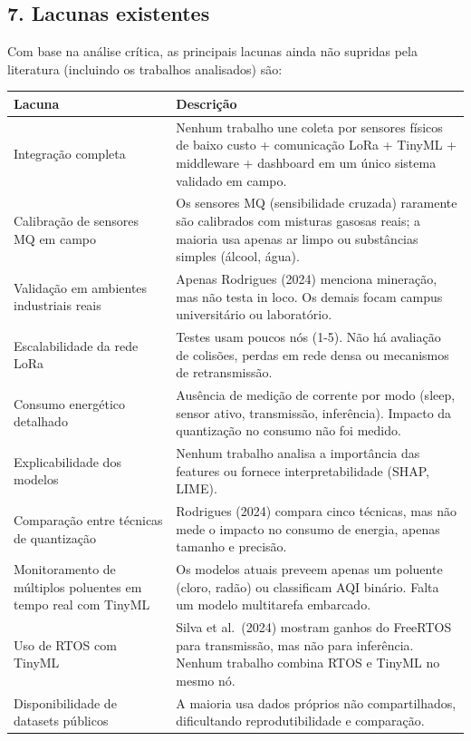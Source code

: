 \documentclass[12pt,a4paper]{article}
\begin{document}
\subsection*{7. Lacunas existentes}

Com base na análise crítica, as principais lacunas ainda não supridas pela literatura (incluindo os trabalhos analisados) são:

\begin{table}[H]
\centering
\small
\begin{tabularx}{\textwidth}{|p{3.5cm}|X|}
\hline
\textbf{Lacuna} & \textbf{Descrição} \\
\hline
Integração completa & Nenhum trabalho une coleta por sensores físicos de baixo custo + comunicação LoRa + TinyML + middleware + dashboard em um único sistema validado em campo. \\
\hline
Calibração de sensores MQ em campo & Os sensores MQ (sensibilidade cruzada) raramente são calibrados com misturas gasosas reais; a maioria usa apenas ar limpo ou substâncias simples (álcool, água). \\
\hline
Validação em ambientes industriais reais & Apenas Rodrigues (2024) menciona mineração, mas não testa in loco. Os demais focam campus universitário ou laboratório. \\
\hline
Escalabilidade da rede LoRa & Testes usam poucos nós (1-5). Não há avaliação de colisões, perdas em rede densa ou mecanismos de retransmissão. \\
\hline
Consumo energético detalhado & Ausência de medição de corrente por modo (sleep, sensor ativo, transmissão, inferência). Impacto da quantização no consumo não foi medido. \\
\hline
Explicabilidade dos modelos & Nenhum trabalho analisa a importância das features ou fornece interpretabilidade (SHAP, LIME). \\
\hline
Comparação entre técnicas de quantização & Rodrigues (2024) compara cinco técnicas, mas não mede o impacto no consumo de energia, apenas tamanho e precisão. \\
\hline
Monitoramento de múltiplos poluentes em tempo real com TinyML & Os modelos atuais preveem apenas um poluente (cloro, radão) ou classificam AQI binário. Falta um modelo multitarefa embarcado. \\
\hline
Uso de RTOS com TinyML & Silva et al.\ (2024) mostram ganhos do FreeRTOS para transmissão, mas não para inferência. Nenhum trabalho combina RTOS e TinyML no mesmo nó. \\
\hline
Disponibilidade de datasets públicos & A maioria usa dados próprios não compartilhados, dificultando reprodutibilidade e comparação. \\
\hline
\end{tabularx}
\end{table}
\end{document}
